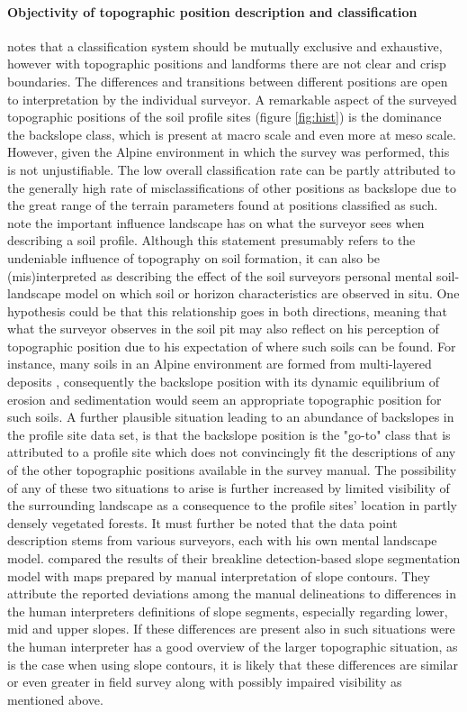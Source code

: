 \documentclass[final,1p,times,twocolumn,authoryear]{elsarticle}
\begin{document}
\paragraph{Objectivity of topographic position description and classification}
notes that a classification system should be mutually exclusive and exhaustive, however with topographic positions and landforms there are not clear and crisp boundaries. The differences and transitions between different positions are open to interpretation by the individual surveyor. A remarkable aspect of the surveyed topographic positions of the soil profile sites (figure \ref{fig:hist}) is the dominance the backslope class, which is present at macro scale and even more at meso scale. However, given the Alpine environment in which the survey was performed, this is not unjustifiable. The low overall classification rate can be partly attributed to the generally high rate of misclassifications of other positions as backslope due to the great range of the terrain parameters found at positions classified as such. \cite{Brevik2015} note the important influence landscape has on what the surveyor sees when describing a soil profile. Although this statement presumably refers to the undeniable influence of topography on soil formation, it can also be (mis)interpreted as describing the effect of the soil surveyors personal mental soil-landscape model on which soil or horizon characteristics are observed in situ. One hypothesis could be that this relationship goes in both directions, meaning that what the surveyor observes in the soil pit may also reflect on his perception of topographic position due to his expectation of where such soils can be found. For instance, many soils in an Alpine environment are formed from multi-layered deposits \citep{Baruck2015,Geitner2011a}, consequently the backslope position with its dynamic equilibrium of erosion and sedimentation would seem an appropriate topographic position for such soils. A further plausible situation leading to an abundance of backslopes in the profile site data set, is that the backslope position is the "go-to" class that is attributed to a profile site which does not convincingly fit the descriptions of any of the other topographic positions available in the survey manual. The possibility of any of these two situations to arise is further increased by limited visibility of the surrounding landscape as a consequence to the profile sites' location in partly densely vegetated forests. It must further be noted that the data point description stems from various surveyors, each with his own mental landscape model. \cite{Matsuura2012} compared the results of their breakline detection-based slope segmentation model with maps prepared by manual interpretation of slope contours. They attribute the reported deviations among the manual delineations to differences in the human interpreters definitions of slope segments, especially regarding lower, mid and upper slopes. If these differences are present also in such situations were the human interpreter has a good overview of the larger topographic situation, as is the case when using slope contours, it is likely that these differences are similar or even greater in field survey along with possibly impaired visibility as mentioned above. 
\end{document}
